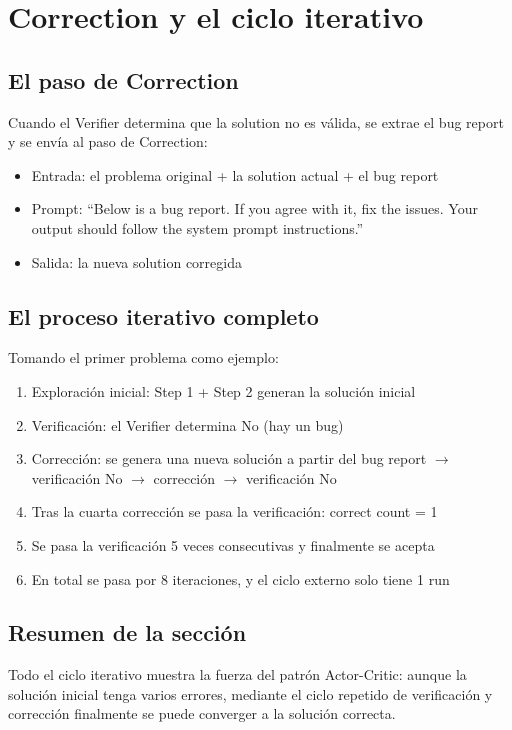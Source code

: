 \section{Correction y el ciclo iterativo}

\subsection{El paso de Correction}

Cuando el Verifier determina que la solution no es válida, se extrae el bug report y se envía al paso de Correction:
\begin{itemize}
    \item Entrada: el problema original + la solution actual + el bug report
    \item Prompt: ``Below is a bug report. If you agree with it, fix the issues. Your output should follow the system prompt instructions.''
    \item Salida: la nueva solution corregida
\end{itemize}

\subsection{El proceso iterativo completo}

Tomando el primer problema como ejemplo:
\begin{enumerate}
    \item Exploración inicial: Step 1 + Step 2 generan la solución inicial
    \item Verificación: el Verifier determina No (hay un bug)
    \item Corrección: se genera una nueva solución a partir del bug report $\rightarrow$ verificación No $\rightarrow$ corrección $\rightarrow$ verificación No
    \item Tras la cuarta corrección se pasa la verificación: correct count = 1
    \item Se pasa la verificación 5 veces consecutivas y finalmente se acepta
    \item En total se pasa por 8 iteraciones, y el ciclo externo solo tiene 1 run
\end{enumerate}

\subsection{Resumen de la sección}

Todo el ciclo iterativo muestra la fuerza del patrón Actor-Critic: aunque la solución inicial tenga varios errores, mediante el ciclo repetido de verificación y corrección finalmente se puede converger a la solución correcta.

